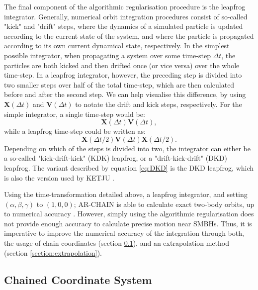 \documentclass[english, twoside]{HYgradu}
\begin{document}
The final component of the algorithmic regularisation procedure is the leapfrog integrator. Generally, numerical orbit integration procedures consist of so-called "kick" and "drift" steps, where the dynamics of a simulated particle is updated according to the current state of the system, and where the particle is propagated according to its own current dynamical state, respectively. In the simplest possible integrator, when propagating a system over some time-step $\Delta t$, the particles are both kicked and then drifted once (or vice versa) over the whole time-step. In a leapfrog integrator, however, the preceding step is divided into two smaller steps over half of the total time-step, which are then calculated before and after the second step. We can help visualise this difference, by using $\mathbf{X}(\Delta t)$ and $\mathbf{V}(\Delta t)$ to notate the drift and kick steps, respectively. For the simple integrator, a single time-step would be:
\begin{equation}
\mathbf{X}(\Delta t)\mathbf{V}(\Delta t),
\end{equation} 
while a leapfrog time-step could be written as:
\begin{equation}
\mathbf{X}(\Delta t/2)\mathbf{V}(\Delta t)\mathbf{X}(\Delta t/2). \label{eq:DKD}
\end{equation}
Depending on which of the steps is divided into two, the integrator can either be a so-called "kick-drift-kick" (KDK) leapfrog, or a "drift-kick-drift" (DKD) leapfrog. The variant described by equation \ref{eq:DKD} is the DKD leapfrog, which is also the version used by KETJU \citep{Rantala2017KETJU}.

Using the time-transformation detailed above, a leapfrog integrator, and setting $(\alpha, \beta, \gamma)$ to $(1, 0, 0)$; AR-CHAIN is able to calculate exact two-body orbits, up to numerical accuracy \citep{Mikkola2008ARCHAIN}. However, simply using the algorithmic regularisation does not provide enough accuracy to calculate precise motion near SMBHs. Thus, it is imperative to improve the numerical accuracy of the integration through both, the usage of chain coordinates (section \ref{section:chained_coordiantes}), and an extrapolation method (section \ref{section:extrapolation}).

\subsection{Chained Coordinate System} \label{section:chained_coordiantes}
\end{document}
